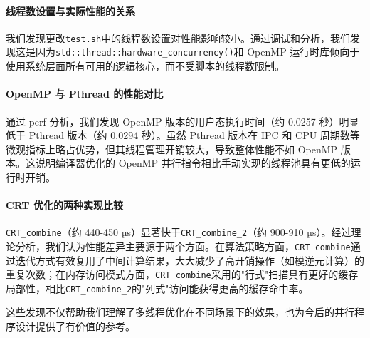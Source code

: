 \documentclass[a4paper]{article}
\begin{document}
\paragraph{线程数设置与实际性能的关系}

我们发现更改\texttt{test.sh}中的线程数设置对性能影响较小。通过调试和分析，我们发现这是因为\texttt{std::thread::hardware\_concurrency()}和 OpenMP 运行时库倾向于使用系统层面所有可用的逻辑核心，而不受脚本的线程数限制。

\paragraph{OpenMP 与 Pthread 的性能对比} 通过 perf 分析，我们发现 OpenMP 版本的用户态执行时间（约 0.0257 秒）明显低于 Pthread 版本（约 0.0294 秒）。虽然 Pthread 版本在 IPC 和 CPU 周期数等微观指标上略占优势，但其线程管理开销较大，导致整体性能不如 OpenMP 版本。这说明编译器优化的 OpenMP 并行指令相比手动实现的线程池具有更低的运行时开销。

\paragraph{CRT 优化的两种实现比较}

\texttt{CRT\_combine}（约 440-450 µs）显著快于\texttt{CRT\_combine\_2}（约 900-910 µs）。经过理论分析，我们认为性能差异主要源于两个方面。在算法策略方面，\texttt{CRT\_combine}通过迭代方式有效复用了中间计算结果，大大减少了高开销操作（如模逆元计算）的重复次数；在内存访问模式方面，\texttt{CRT\_combine}采用的"行式"扫描具有更好的缓存局部性，相比\texttt{CRT\_combine\_2}的"列式"访问能获得更高的缓存命中率。

这些发现不仅帮助我们理解了多线程优化在不同场景下的效果，也为今后的并行程序设计提供了有价值的参考。
\end{document}
